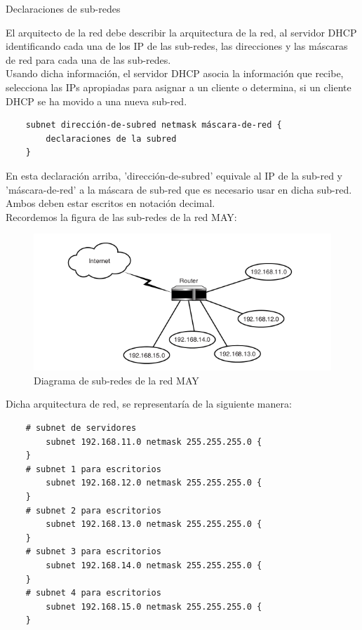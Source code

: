 \begin{frame}{Declaraciones de sub-redes} 
    
    El arquitecto de la red debe describir la arquitectura de la red, al
    servidor DHCP identificando cada una de los IP de las sub-redes, las
    direcciones y las máscaras de red para cada una de las sub-redes.\\[0.2cm]

    Usando dicha información, el servidor DHCP asocia la información que
    recibe, selecciona las IPs apropiadas para asignar a un cliente o
    determina, si un cliente DHCP se ha movido a una nueva
    sub-red.\\[0.2cm]

    \begin{verbatim}
    subnet dirección-de-subred netmask máscara-de-red {
        declaraciones de la subred
    }
    \end{verbatim}

    En esta declaración arriba, 'dirección-de-subred' equivale al IP de la
    sub-red y 'máscara-de-red' a la máscara de sub-red que es necesario usar en
    dicha sub-red. Ambos deben estar escritos en notación decimal.\\[0.2cm]

    Recordemos la figura de las sub-redes de la red MAY:

    \begin{figure}
    \begin{center}

    \includegraphics[scale=0.65]{images/2-2.png}
    \caption{Diagrama de sub-redes de la red  MAY} 
    \label{MAY-4}

    \end{center}
    \end{figure}

    Dicha arquitectura de red, se representaría de la siguiente manera:
    \begin{verbatim}
    # subnet de servidores
        subnet 192.168.11.0 netmask 255.255.255.0 {
    }
    # subnet 1 para escritorios
        subnet 192.168.12.0 netmask 255.255.255.0 {
    }
    # subnet 2 para escritorios
        subnet 192.168.13.0 netmask 255.255.255.0 {
    }
    # subnet 3 para escritorios
        subnet 192.168.14.0 netmask 255.255.255.0 {
    }
    # subnet 4 para escritorios
        subnet 192.168.15.0 netmask 255.255.255.0 {
    }
    \end{verbatim}
   

\end{frame}
